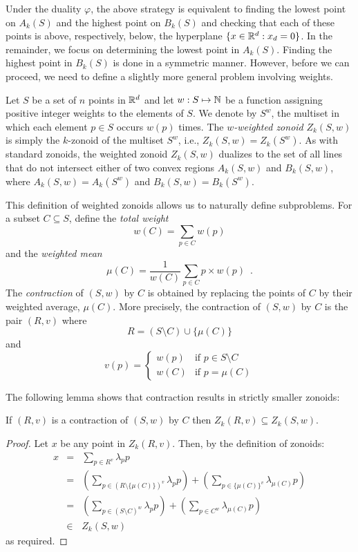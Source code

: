 \documentclass[lotsofwhite]{patmorin}
\newcommand{\dual}{\varphi}
\begin{document}
Under the duality $\dual$, the above strategy is equivalent to finding
the lowest point on $A_k(S)$ and the highest point on $B_k(S)$ and
checking that each of these points is above, respectively, below, the
hyperplane $\{x\in\mathbb{R}^d:x_d=0\}$.  In the remainder, we focus on
determining the lowest point in $A_k(S)$.  Finding the highest point
in $B_k(S)$ is done in a symmetric manner.  However, before we can
proceed, we need to define a slightly more general problem involving
weights.

Let $S$ be a set of $n$ points in $\mathbb{R}^d$ and let $w:S\mapsto\mathbb{N}$ be a
function assigning positive integer weights to the elements of $S$.
We denote by $S^w$, the multiset in which each element $p\in S$ occurs
$w(p)$ times.  The \emph{$w$-weighted zonoid} $Z_k(S,w)$ is simply the
$k$-zonoid of the multiset $S^w$, i.e., $Z_k(S,w)=Z_k(S^w)$.  As with
standard zonoids, the weighted zonoid $Z_k(S,w)$ dualizes to the set
of all lines that do not intersect either of two convex regions
$A_k(S,w)$ and $B_k(S,w)$, where $A_k(S,w)=A_k(S^w)$ and
$B_k(S,w)=B_k(S^w)$.

This definition of weighted zonoids allows us to naturally define
subproblems.  For a subset $C\subseteq S$, define the \emph{total
weight}
\[
       w(C)=\sum_{p\in C}w(p)
\]
and the \emph{weighted mean}
\[ 
       \mu(C)=\frac{1}{w(C)}\sum_{p\in C} p\times w(p) \enspace .
\]
The \emph{contraction} of
$(S,w)$ by $C$ is obtained by replacing the points of $C$ by their
weighted average, $\mu(C)$.  More precisely, the contraction of
$(S,w)$ by $C$ is the pair $(R,v)$ where 
\[ R = (S\setminus C) \cup \{ \mu(C) \} \] 
and 
\[ v(p) = \left\{\begin{array}{ll} 
        w(p) & \mbox{if $p\in S\setminus C$} \\ 
        w(C) & \mbox{if $p=\mu(C)$} \end{array}\right.
\]

The following lemma shows that contraction results in strictly smaller
zonoids:

\begin{lem}
If $(R,v)$ is a contraction of $(S,w)$ by $C$ then $Z_k(R,v)
\subseteq Z_k(S,w)$.
\end{lem}

\begin{proof}
Let $x$ be any point in $Z_k(R,v)$.  Then, by the definition of
zonoids:
\begin{eqnarray*}
    x &=& \sum_{p\in R^v} \lambda_pp \\
      &=& \left( \sum_{p\in (R\setminus \{\mu(C)\})^v} \lambda_pp \right)
          + \left( \sum_{p\in \{\mu(C)\}^v}\lambda_{\mu(C)}p \right) \\
      &=& \left(\sum_{p\in (S\setminus C)^w} \lambda_pp \right)
          + \left(\sum_{p\in C^w}\lambda_{\mu(C)} p\right) \\
      &\in& Z_k(S,w)
\end{eqnarray*}
as required.
\end{proof}
\end{document}
